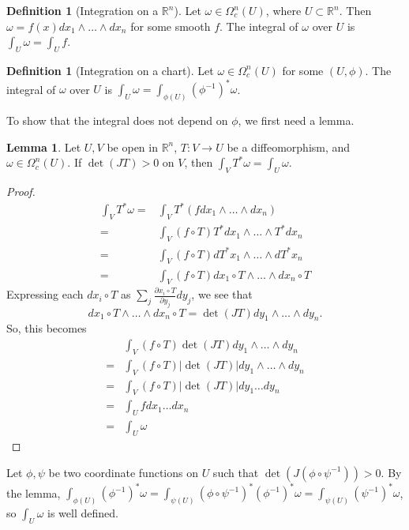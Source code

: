 \documentclass[]{article}
\DeclareMathOperator{\Det}{det}
\theoremstyle{definition}
\theoremstyle{definition}
\newtheorem{definition}[theorem]{Definition} %
\newtheorem{lemma}[theorem]{Lemma}
\begin{document}
\begin{definition}[Integration on a $\mathbb{R}^n$]
    Let $\omega\in \Omega^n_c(U)$, where $U\subset\mathbb{R}^n$. Then $\omega=f(x)dx_1\wedge\dots\wedge dx_n$ for some smooth $f$. The integral of $\omega$ over $U$ is $\int_U\omega=\int_U f$.
\end{definition}

\begin{definition}[Integration on a chart]
    Let $\omega\in \Omega^n_c(U)$ for some $(U, \phi)$. The integral of $\omega$ over $U$ is $\int_U\omega=\int_{\phi(U)}(\phi^{-1})^*\omega$. 
\end{definition}

To show that the integral does not depend on $\phi$, we first need a lemma.

\begin{lemma}
    Let $U, V$ be open in $\mathbb{R}^n$, $T:V \rightarrow U$ be a diffeomorphism, and $\omega\in \Omega^n_c(U)$. If $\Det(JT)>0$ on $V$, then $\int_{V}T^*\omega=\int_U\omega$.
\end{lemma}

\begin{proof}
    \begin{align*}
        \int_VT^*\omega=&\int_VT^*(fdx_1\wedge\dots\wedge dx_n)\\
        =&\int_V(f\circ T)T^*dx_1\wedge\dots\wedge T^*dx_n\\
        =&\int_V(f\circ T)dT^*x_1\wedge\dots\wedge dT^*x_n\\
        =&\int_V(f\circ T)dx_1\circ T\wedge\dots\wedge dx_n\circ T
    \end{align*}
    Expressing each $dx_i\circ T$ as $\sum_j \frac{\partial x_i\circ T}{\partial y_j}dy_j$, we see that \[dx_1\circ T\wedge\dots\wedge dx_n\circ T=\Det(JT)dy_1\wedge\dots\wedge dy_n.\] So, this becomes
    \begin{align*}
        &\int_V(f\circ T)\Det(JT)dy_1\wedge\dots\wedge dy_n\\
        =&\int_V(f\circ T)|\Det(JT)|dy_1\wedge\dots\wedge dy_n\\
        =&\int_V(f\circ T)|\Det(JT)|dy_1\dots dy_n\\
        =&\int_U fdx_1\dots dx_n\\
        =&\int_U\omega
    \end{align*}
\end{proof}

Let $\phi, \psi$ be two coordinate functions on $U$ such that $\Det (J(\phi\circ\psi^{-1}))>0$. By the lemma, $\int_{\phi(U)}(\phi^{-1})^*\omega=\int_{\psi(U)}(\phi\circ\psi^{-1})^*(\phi^{-1})^*\omega=\int_{\psi(U)}(\psi ^{-1})^*\omega$, so $\int_U\omega$ is well defined.
\end{document}
